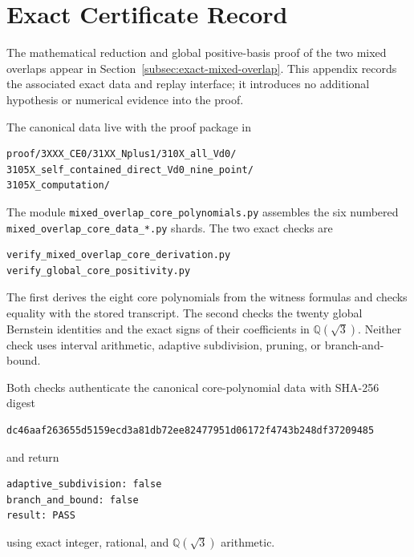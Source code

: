 \section{Exact Certificate Record}
\label{app:certificate-record}

The mathematical reduction and global positive-basis proof of the two mixed
overlaps appear in Section~\ref{subsec:exact-mixed-overlap}.  This appendix
records the associated exact data and replay interface; it introduces no
additional hypothesis or numerical evidence into the proof.

The canonical data live with the proof package in
\begin{verbatim}
proof/3XXX_CE0/31XX_Nplus1/310X_all_Vd0/
3105X_self_contained_direct_Vd0_nine_point/
3105X_computation/
\end{verbatim}
The module \texttt{mixed\_overlap\_core\_polynomials.py} assembles the six
numbered \texttt{mixed\_overlap\_core\_data\_*.py} shards.  The two exact
checks are
\begin{verbatim}
verify_mixed_overlap_core_derivation.py
verify_global_core_positivity.py
\end{verbatim}
The first derives the eight core polynomials from the witness formulas and
checks equality with the stored transcript.  The second checks the twenty
global Bernstein identities and the exact signs of their coefficients in
$\mathbb Q(\sqrt3)$.  Neither check uses interval arithmetic, adaptive
subdivision, pruning, or branch-and-bound.

Both checks authenticate the canonical core-polynomial data with SHA-256
digest
\begin{verbatim}
dc46aaf263655d5159ecd3a81db72ee82477951d06172f4743b248df37209485
\end{verbatim}
and return
\begin{verbatim}
adaptive_subdivision: false
branch_and_bound: false
result: PASS
\end{verbatim}
using exact integer, rational, and $\mathbb Q(\sqrt3)$ arithmetic.
